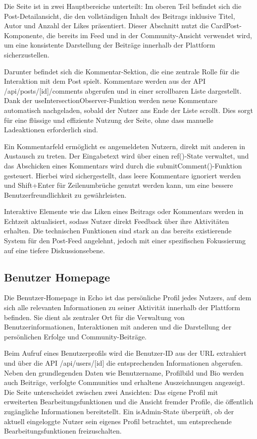 \documentclass[a4paper,12pt]{article}
\begin{document}
Die Seite ist in zwei Hauptbereiche unterteilt: Im oberen Teil befindet sich
die Post-Detailansicht, die den vollständigen Inhalt des Beitrags inklusive
Titel, Autor und Anzahl der Likes präsentiert. Dieser
Abschnitt nutzt die CardPost-Komponente, die bereits im Feed und in der
Community-Ansicht verwendet wird, um eine konsistente Darstellung der Beiträge
innerhalb der Plattform sicherzustellen.

Darunter befindet sich die Kommentar-Sektion, die eine zentrale Rolle für die
Interaktion mit dem Post spielt. Kommentare werden aus der API
/api/posts/[id]/comments abgerufen und in einer scrollbaren Liste dargestellt.
Dank der useIntersectionObserver-Funktion werden neue Kommentare automatisch
nachgeladen, sobald der Nutzer ans Ende der Liste scrollt. Dies sorgt für eine
flüssige und effiziente Nutzung der Seite, ohne dass manuelle Ladeaktionen
erforderlich sind.

Ein Kommentarfeld ermöglicht es angemeldeten Nutzern, direkt mit anderen in
Austausch zu treten. Der Eingabetext wird über einen ref()-State verwaltet, und
das Abschicken eines Kommentars wird durch die submitComment()-Funktion
gesteuert. Hierbei wird sichergestellt, dass leere Kommentare ignoriert werden
und Shift+Enter für Zeilenumbrüche genutzt werden kann, um eine bessere
Benutzerfreundlichkeit zu gewährleisten.

Interaktive Elemente wie das Liken eines Beitrags oder Kommentars werden in
Echtzeit aktualisiert, sodass Nutzer direkt Feedback über ihre Aktivitäten
erhalten. Die technischen Funktionen sind stark an das bereits existierende
System für den Post-Feed angelehnt, jedoch mit einer spezifischen Fokussierung
auf eine tiefere Diskussionsebene.

\subsection{Benutzer Homepage}
Die Benutzer-Homepage in Echo ist das persönliche Profil jedes Nutzers, auf dem
sich alle relevanten Informationen zu seiner Aktivität innerhalb der Plattform
befinden. Sie dient als zentraler Ort für die Verwaltung von
Benutzerinformationen, Interaktionen mit anderen und die Darstellung der
persönlichen Erfolge und Community-Beiträge.

Beim Aufruf eines Benutzerprofils wird die Benutzer-ID aus der URL extrahiert
und über die API /api/users/[id] die entsprechenden Informationen abgerufen.
Neben den grundlegenden Daten wie Benutzername, Profilbild und Bio werden auch
Beiträge, verfolgte Communities und erhaltene Auszeichnungen angezeigt. Die
Seite unterscheidet zwischen zwei Ansichten: Das eigene Profil mit erweiterten
Bearbeitungsfunktionen und die Ansicht fremder Profile, die öffentlich
zugängliche Informationen bereitstellt. Ein isAdmin-State überprüft, ob der
aktuell eingeloggte Nutzer sein eigenes Profil betrachtet, um entsprechende
Bearbeitungsfunktionen freizuschalten.
\end{document}
